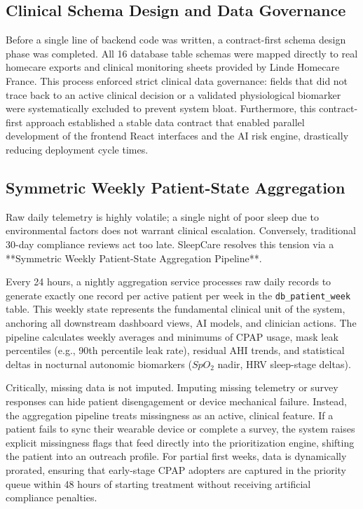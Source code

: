 \documentclass[conference]{IEEEtran}
\begin{document}
\subsection{Clinical Schema Design and Data Governance}

Before a single line of backend code was written, a contract-first schema design phase was completed. All 16 database table schemas were mapped directly to real homecare exports and clinical monitoring sheets provided by Linde Homecare France. This process enforced strict clinical data governance: fields that did not trace back to an active clinical decision or a validated physiological biomarker were systematically excluded to prevent system bloat. Furthermore, this contract-first approach established a stable data contract that enabled parallel development of the frontend React interfaces and the AI risk engine, drastically reducing deployment cycle times.

\subsection{Symmetric Weekly Patient-State Aggregation}

Raw daily telemetry is highly volatile; a single night of poor sleep due to environmental factors does not warrant clinical escalation. Conversely, traditional 30-day compliance reviews act too late. SleepCare resolves this tension via a **Symmetric Weekly Patient-State Aggregation Pipeline**.

Every 24 hours, a nightly aggregation service processes raw daily records to generate exactly one record per active patient per week in the \texttt{db\_patient\_week} table. This weekly state represents the fundamental clinical unit of the system, anchoring all downstream dashboard views, AI models, and clinician actions. The pipeline calculates weekly averages and minimums of CPAP usage, mask leak percentiles (e.g., 90th percentile leak rate), residual AHI trends, and statistical deltas in nocturnal autonomic biomarkers ($SpO_2$ nadir, HRV sleep-stage deltas). 

Critically, missing data is not imputed. Imputing missing telemetry or survey responses can hide patient disengagement or device mechanical failure. Instead, the aggregation pipeline treats missingness as an active, clinical feature. If a patient fails to sync their wearable device or complete a survey, the system raises explicit missingness flags that feed directly into the prioritization engine, shifting the patient into an outreach profile. For partial first weeks, data is dynamically prorated, ensuring that early-stage CPAP adopters are captured in the priority queue within 48 hours of starting treatment without receiving artificial compliance penalties.
\end{document}
